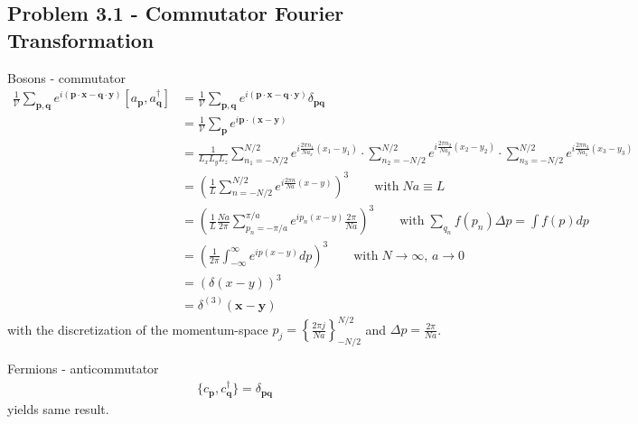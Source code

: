 \documentclass[10pt,a4paper]{book}
\theoremstyle{definition}
\begin{document}
\subsection{Problem 3.1 - Commutator Fourier Transformation}
Bosons - commutator
\begin{align}
\frac{1}{\mathcal{V}}\sum_{\mathbf{p,q}}e^{i(\mathbf{p}\cdot\mathbf{x}-\mathbf{q}\cdot\mathbf{y})}[a_\mathbf{p},a^\dagger_\mathbf{q}]
&=\frac{1}{\mathcal{V}}\sum_{\mathbf{p,q}}e^{i(\mathbf{p}\cdot\mathbf{x}-\mathbf{q}\cdot\mathbf{y})}\delta_{\mathbf{pq}}\\
&=\frac{1}{\mathcal{V}}\sum_{\mathbf{p}}e^{i\mathbf{p}\cdot(\mathbf{x}-\mathbf{y})}\\
&=\frac{1}{L_xL_yL_z}\sum_{n_1=-N/2}^{N/2}e^{i\frac{2\pi n_1}{Na_x}(x_1-y_1)}\cdot\sum_{n_2=-N/2}^{N/2}e^{i\frac{2\pi n_2}{Na_y}(x_2-y_2)}\cdot\sum_{n_3=-N/2}^{N/2}e^{i\frac{2\pi n_3}{Na_z}(x_3-y_3)}\\
&=\left(\frac{1}{L}\sum_{n=-N/2}^{N/2}e^{i\frac{2\pi n}{Na}(x-y)}\right)^3\qquad\text{with}\;Na\equiv L\\
&=\left(\frac{1}{L}\frac{Na}{2\pi}\sum_{p_n=-\pi/a}^{\pi/a}e^{ip_n(x-y)}\frac{2\pi}{Na}\right)^3\qquad\text{with}\;\sum_{q_n}f(p_n)\Delta p=\int f(p)dp\\
&=\left(\frac{1}{2\pi}\int_{-\infty}^{\infty}e^{ip(x-y)}dp\right)^3\qquad\text{with}\;N\rightarrow\infty,\,a\rightarrow0\\
&=\left(\delta(x-y)\right)^3\\
&=\delta^{(3)}(\mathbf{x}-\mathbf{y})
\end{align}
with the discretization of the momentum-space $p_j=\left\{\frac{2\pi j}{Na}\right\}_{-N/2}^{N/2}$ and $\Delta p=\frac{2\pi}{Na}$.

Fermions - anticommutator
\begin{align}
\{c_\mathbf{p},c^\dagger_\mathbf{q}\}=\delta_{\mathbf{p}\mathbf{q}}
\end{align}
yields same result.
\end{document}
